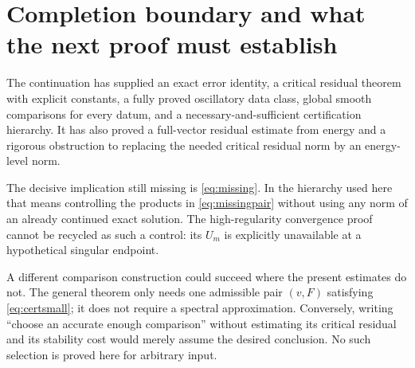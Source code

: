 \documentclass[11pt,a4paper]{article}
\theoremstyle{definition}\newtheorem{definition}[theorem]{Definition}
\theoremstyle{remark}\newtheorem{remark}[theorem]{Remark}
\numberwithin{equation}{section}
\begin{document}
\section{Completion boundary and what the next proof must establish}
\label{sec:boundary}
The continuation has supplied an exact error identity, a critical residual theorem with explicit constants, a fully proved oscillatory data class, global smooth comparisons for every datum, and a necessary-and-sufficient certification hierarchy. It has also proved a full-vector residual estimate from energy and a rigorous obstruction to replacing the needed critical residual norm by an energy-level norm.

The decisive implication still missing is \eqref{eq:missing}. In the hierarchy used here that means controlling the products in \eqref{eq:missingpair} without using any norm of an already continued exact solution. The high-regularity convergence proof cannot be recycled as such a control: its $U_m$ is explicitly unavailable at a hypothetical singular endpoint.

A different comparison construction could succeed where the present estimates do not. The general theorem only needs one admissible pair $(v,F)$ satisfying \eqref{eq:certsmall}; it does not require a spectral approximation. Conversely, writing ``choose an accurate enough comparison'' without estimating its critical residual and its stability cost would merely assume the desired conclusion. No such selection is proved here for arbitrary input.
\end{document}
